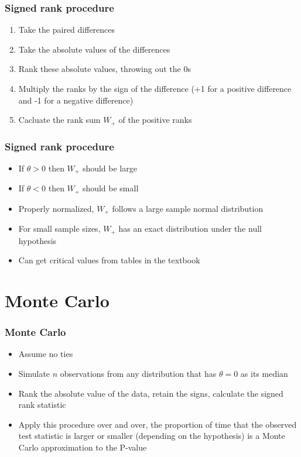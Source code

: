 \documentclass[aspectratio=169]{beamer}
\begin{document}
\begin{frame}\frametitle{Signed rank procedure}
\begin{enumerate}
\item Take the paired differences
\item Take the absolute values of the differences
\item Rank these absolute values, throwing out the 0s
\item Multiply the ranks by the sign of the difference (+1 for a positive difference and -1 for
  a negative difference)
\item Cacluate the rank sum $W_+$ of the positive ranks
\end{enumerate}
\end{frame}

\begin{frame}\frametitle{Signed rank procedure}
\begin{itemize}
\item If $\theta > 0$ then $W_+$ should be large 
\item If $\theta < 0$ then $W_+$ should be small 
\item Properly normalized, $W_+$ follows a large sample normal distribution
\item For small sample sizes, $W_+$ has an exact distribution under the null hypothesis
\item Can get critical values from tables in the textbook
\end{itemize}
\end{frame}

\section{Monte Carlo}
\begin{frame}\frametitle{Monte Carlo}
\begin{itemize}
\item Assume no ties
\item Simulate $n$ observations from any distribution that has $\theta = 0$ as
  its median
\item Rank the absolute value of the data, retain the signs, calculate
  the signed rank statistic
\item Apply this procedure over and over, the proportion of time that
  the observed test statistic is larger or smaller (depending on the hypothesis)
  is a Monte Carlo approximation to the P-value
\end{itemize}
\end{frame}
\end{document}
